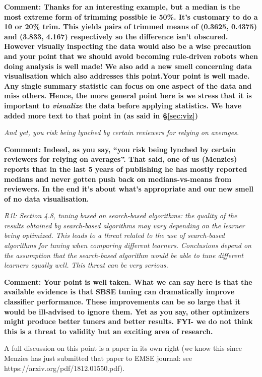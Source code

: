 {\bf Comment: Thanks for an interesting example, but a median is the most extreme form of trimming possible ie 50\%.  It's customary to do a 10 or 20\% trim.  This yields pairs of trimmed means of (0.3625, 0.4375) and (3.833, 4.167) respectively so the difference isn't obscured.  However visually inspecting the data would also be a wise precaution and your point that we should avoid becoming rule-driven robots when doing analysis is well made!  We also add a new smell concerning data visualisation which also addresses this point.Your point is well made. Any single summary statistic can focus on one aspect of the data and miss others. Hence, the more general point here is we stress that it is important to {\em visualize} the data before applying statistics. We have added more text to that point in (as said in \S\vref{sec:viz})}

{\em And yet, you risk being lynched by certain reviewers for relying on averages.}

{\bf Comment: Indeed, as you say, ``you risk being lynched by certain reviewers for relying on averages''.  That said, one of us (Menzies) reports that in the last 5 years of publishing he has mostly reported medians and never gotten push back on medians-vs-means from reviewers. In the end it's about what's appropriate and our new smell of no data visualisation.   
}

{\em R1l:  Section 4.8, tuning based on search-based algorithms: the quality of the results obtained by search-based algorithms may vary depending on the learner being optimized. This leads to a threat related to the use of search-based algorithms for tuning when comparing different learners. Conclusions depend on the assumption that the search-based algorithm would be able to tune different learners equally well. This threat can be very serious.}

{\bf Comment: Your point is well taken. What we can say here is that the available evidence is that SBSE
tuning can dramatically improve classifier performance. These improvements can be so large that it
would be ill-advised to ignore them. Yet as you say, other optimizers might produce better tuners and better results. FYI- we do not think this is a threat to validity but an exciting area of research. 

A full discussion on this point is a paper in its own right
(we know this since Menzies has just submitted that paper to EMSE journal: \newline see https://arxiv.org/pdf/1812.01550.pdf).  
}


